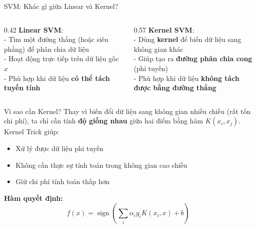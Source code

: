 \begin{frame}{SVM: Khác gì giữa Linear và Kernel?}
    \begin{columns}
        \begin{column}{0.42\textwidth}
        \textbf{Linear SVM}:\\
            - Tìm một đường thẳng (hoặc siêu phẳng) để phân chia dữ liệu\\
            - Hoạt động trực tiếp trên dữ liệu gốc $x$\\
            - Phù hợp khi dữ liệu \textbf{có thể tách tuyến tính}
        \end{column}

        \begin{column}{0.57\textwidth}
        \textbf{Kernel SVM}:\\
            - Dùng \textbf{kernel} để biến dữ liệu sang không gian khác\\
            - Giúp tạo ra \textbf{đường phân chia cong} (phi tuyến)\\
            - Phù hợp khi dữ liệu \textbf{không tách được bằng đường thẳng}
        \end{column}
    \end{columns}

    \begin{alertblock}{Vì sao cần Kernel?}
        Thay vì biến đổi dữ liệu sang không gian nhiều chiều (rất tốn chi phí),
        ta chỉ cần tính \textbf{độ giống nhau} giữa hai điểm bằng hàm $K(x_i, x_j)$.\\
        Kernel Trick giúp:
        \begin{itemize}
            \item Xử lý được dữ liệu phi tuyến
            \item Không cần thực sự tính toán trong không gian cao chiều
            \item Giữ chi phí tính toán thấp hơn
        \end{itemize}
    \end{alertblock}

    \vspace{0.2cm}

    \textbf{Hàm quyết định:}
    \[
        f(x) = \operatorname{sign}\left(\sum_i \alpha_i y_i K(x_i, x) + b\right)
    \]
\end{frame}

